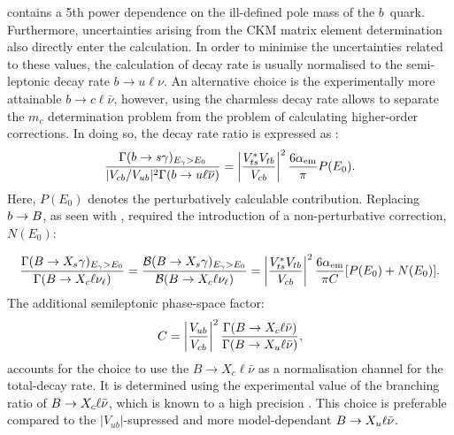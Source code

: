  contains a 5th power dependence on the ill-defined pole mass of the $b$~quark.
Furthermore, uncertainties arising from the CKM matrix element determination also directly enter the calculation.
In order to minimise the uncertainties related to these values, the calculation of \btosgamma decay rate is usually normalised to the semi-leptonic decay rate $b\rightarrow u\ell\nu$.
An alternative choice is the experimentally more attainable $b\rightarrow c\ell\bar{\nu}$, 
however, using the charmless decay rate allows to separate the $m_c$ determination problem from the problem of calculating higher-order corrections.
In doing so, the decay rate ratio is expressed as \cite{Gambino:2001ew}:
\begin{equation}
    \frac{\Gamma(b\rightarrow s\gamma)_{{E_{\gamma}}>E_0}}{|V_{cb}/V_{ub}|^2 \Gamma(b\rightarrow u \ell\overline{\nu})} = \left|\frac{V_{ts}^*V_{tb}}{V_{cb}}\right|^2 \frac{6\alpha_{\mathrm{em}}}{\pi}P(E_0).
\end{equation}
Here, $P(E_0)$ denotes the perturbatively calculable contribution. 
Replacing $b\rightarrow B$, as seen with , required the introduction of a non-perturbative correction, $N(E_0)$:

\begin{equation}\label{eq:normalised_br}
    \frac{\Gamma(\BtoXsgamma)_{\Egamma>E_0}}{\Gamma(\B\to X_c\ell\nu_\ell)} = \frac{\mathcal{B}(\BtoXsgamma)_{\Egamma>E_0}}{\mathcal{B}(\B\to X_c\ell\nu_\ell)} = \left|\frac{V_{ts}^*V_{tb}}{V_{cb}}\right|^2\frac{6\alpha_{\mathrm{em}}}{\pi C}[P(E_0)+N(E_0)].
\end{equation}
The additional semileptonic phase-space factor:
\begin{equation}
    C = \left|\frac{V_{ub}}{V_{cb}}\right|^2 \frac{\Gamma(B\rightarrow X_c\ell\bar{\nu})}{\Gamma(B\rightarrow X_u\ell\bar{\nu})},
\end{equation}  
accounts for the choice to use the $B\rightarrow X_c\ell\bar{\nu}$ as a normalisation channel for the total-decay rate. 
It is determined using the experimental value of the branching ratio of $B\rightarrow X_c \ell\bar{\nu}$, which is known to a high precision \cite{Alberti:2014yda,Workman:2022ynf}.
This choice is preferable compared to the $|V_{ub}|$-supressed and more model-dependant $B\rightarrow X_u\ell\bar{\nu}$.

